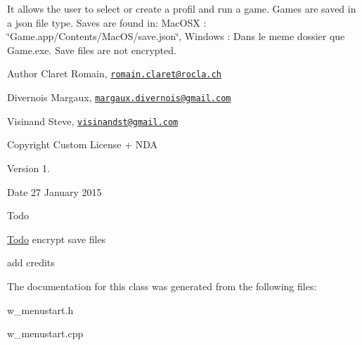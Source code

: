 It allows the user to select or create a profil and run a game. Games are saved in a json file type. Saves are found in\+: Mac\+O\+S\+X \+: \char`\"{}\+Game.\+app/\+Contents/\+Mac\+O\+S/save.\+json\char`\"{}, Windows \+: Dans le meme dossier que Game.\+exe. Save files are not encrypted. \begin{DoxyAuthor}{Author}
Claret Romain, \href{mailto:romain.claret@rocla.ch}{\tt romain.\+claret@rocla.\+ch} 

Divernois Margaux, \href{mailto:margaux.divernois@gmail.com}{\tt margaux.\+divernois@gmail.\+com} 

Visinand Steve, \href{mailto:visinandst@gmail.com}{\tt visinandst@gmail.\+com} 
\end{DoxyAuthor}
\begin{DoxyCopyright}{Copyright}
Custom License + N\+D\+A 
\end{DoxyCopyright}
\begin{DoxyVersion}{Version}
1. 
\end{DoxyVersion}
\begin{DoxyDate}{Date}
27 January 2015 
\end{DoxyDate}
\begin{DoxyRefDesc}{Todo}
\item[\hyperlink{todo__todo000013}{Todo}]encrypt save files 

add credits \end{DoxyRefDesc}


The documentation for this class was generated from the following files\+:\begin{DoxyCompactItemize}
\item 
w\+\_\+menustart.\+h\item 
w\+\_\+menustart.\+cpp\end{DoxyCompactItemize}
